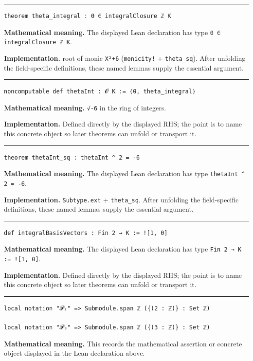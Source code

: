 \documentclass[UTF8,a4paper,11pt,fontset=fandol]{ctexart}
\theoremstyle{definition}
\newcommand{\statementsep}{\par\medskip\hrule\medskip}
\begin{document}
\statementsep
\begin{verbatim}
theorem theta_integral : θ ∈ integralClosure ℤ K
\end{verbatim}
\noindent\textbf{Mathematical meaning.} The displayed Lean declaration has type \texttt{θ ∈ integralClosure ℤ K}.\par
\noindent\textbf{Implementation.} root of monic \texttt{X²+6} (\texttt{monicity!} + \texttt{theta\_\allowbreak{}sq}). After unfolding the field-specific definitions, these named lemmas supply the essential argument.\par
\statementsep
\begin{verbatim}
noncomputable def thetaInt : 𝓞 K := ⟨θ, theta_integral⟩
\end{verbatim}
\noindent\textbf{Mathematical meaning.} \texttt{√-6} in the ring of integers.\par
\noindent\textbf{Implementation.} Defined directly by the displayed RHS; the point is to name this concrete object so later theorems can unfold or transport it.\par
\statementsep
\begin{verbatim}
theorem thetaInt_sq : thetaInt ^ 2 = -6
\end{verbatim}
\noindent\textbf{Mathematical meaning.} The displayed Lean declaration has type \texttt{thetaInt \textasciicircum{} 2 = -6}.\par
\noindent\textbf{Implementation.} \texttt{Subtype.\allowbreak{}ext} + \texttt{theta\_\allowbreak{}sq}. After unfolding the field-specific definitions, these named lemmas supply the essential argument.\par
\statementsep
\begin{verbatim}
def integralBasisVectors : Fin 2 → K := ![1, θ]
\end{verbatim}
\noindent\textbf{Mathematical meaning.} The displayed Lean declaration has type \texttt{Fin 2 → K := ![1, θ]}.\par
\noindent\textbf{Implementation.} Defined directly by the displayed RHS; the point is to name this concrete object so later theorems can unfold or transport it.\par
\statementsep
\begin{verbatim}
local notation "𝓟₂" => Submodule.span ℤ ({(2 : ℤ)} : Set ℤ)

local notation "𝓟₃" => Submodule.span ℤ ({(3 : ℤ)} : Set ℤ)
\end{verbatim}
\noindent\textbf{Mathematical meaning.} This records the mathematical assertion or concrete object displayed in the Lean declaration above.\par
\end{document}
